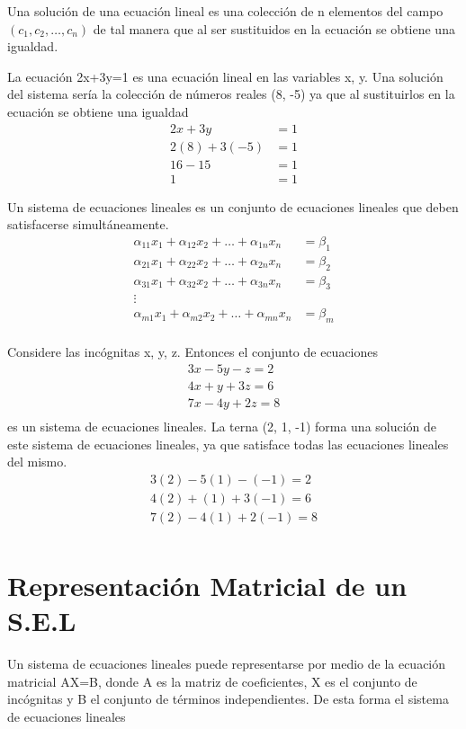 Una solución de una ecuación lineal es una colección de n elementos del campo $(c_1, c_2, \hdots, c_n)$ de tal manera que al ser sustituidos en la ecuación se obtiene una igualdad. 
\begin{ejemplo}
La ecuación 2x+3y=1 es una ecuación lineal en las variables x, y. Una solución del sistema sería la colección de números reales (8, -5) ya que al sustituirlos en la ecuación se obtiene una igualdad
\begin{align*}
2x+3y&=1\\
2(8)+3(-5)&=1\\
16-15&=1\\
1&=1
\end{align*}
\end{ejemplo}
Un sistema de ecuaciones lineales es un conjunto de ecuaciones lineales que deben satisfacerse simultáneamente.
\begin{align*}
\alpha_{11} x_1+\alpha_{12} x_2+\hdots+\alpha_{1n} x_n&=\beta_1\\
\alpha_{21} x_1+\alpha_{22} x_2+\hdots+\alpha_{2n} x_n&=\beta_2\\
\alpha_{31} x_1+\alpha_{32} x_2+\hdots+\alpha_{3n} x_n&=\beta_3\\
\vdots\\
\alpha_{m1} x_1+\alpha_{m2} x_2+\hdots+\alpha_{mn} x_n&=\beta_m\\
\end{align*} 
\begin{ejemplo}
Considere las incógnitas x, y, z. Entonces el conjunto de ecuaciones
\begin{align*}
3x-5y-z=2\\
4x+y+3z=6\\
7x-4y+2z=8\\
\end{align*}
es un sistema de ecuaciones lineales. La terna (2, 1, -1) forma una solución de este sistema de ecuaciones lineales, ya que satisface todas las ecuaciones lineales del mismo.
\begin{align*}
3(2)-5(1)-(-1)=2\\
4(2)+(1)+3(-1)=6\\
7(2)-4(1)+2(-1)=8\\
\end{align*}
\end{ejemplo}

\section{Representación Matricial de un S.E.L}
Un sistema de ecuaciones lineales puede representarse por medio de la ecuación matricial AX=B, donde A es la matriz de coeficientes, X es el conjunto de incógnitas y B el conjunto de términos independientes. De esta forma el sistema de ecuaciones lineales

